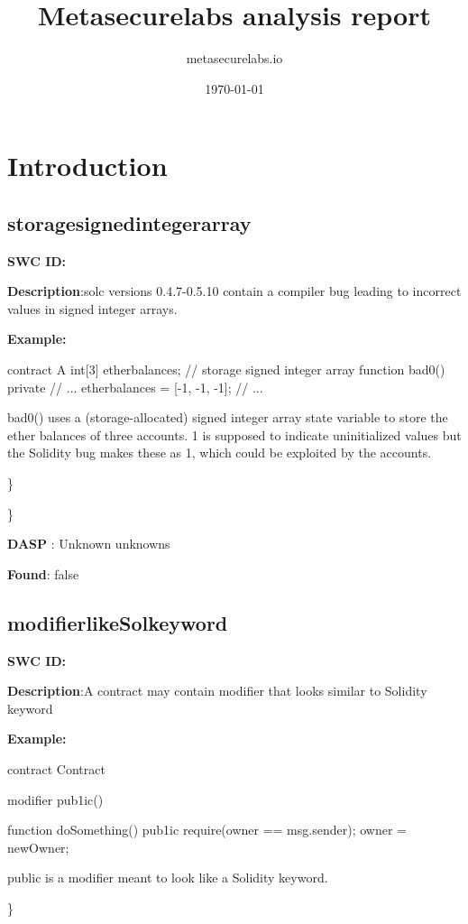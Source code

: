 \documentclass{article}
\title{Metasecurelabs analysis report}
\author{metasecurelabs.io }
\date{\today}
\begin{document}
 

\maketitle 

\section{Introduction} 
\subsection{storage\textunderscore signed\textunderscore integer\textunderscore array} 
\textbf{SWC \textunderscore ID:} 

\textbf{Description}:solc versions 0.4.7-0.5.10 contain a compiler bug leading to incorrect values in signed integer arrays.


\textbf{Example:} 

contract A {
  int[3] ether\textunderscore balances; // storage signed integer array
  function bad0() private {
    // ...
    ether\textunderscore balances = [-1, -1, -1];
    // ...
  }
}

bad0() uses a (storage-allocated) signed integer array state variable to store the ether balances of three accounts. 1 is supposed to indicate uninitialized values but the Solidity bug makes these as 1, which could be exploited by the accounts.

\} 

\} 

\textbf{DASP} : Unknown unknowns

\textbf{Found}: false

\subsection{modifier\textunderscore like\textunderscore Sol\textunderscore keyword} 
\textbf{SWC \textunderscore ID:} 

\textbf{Description}:A contract may contain modifier that looks similar to Solidity keyword


\textbf{Example:} 

contract Contract{
    modifier pub1ic() {
    }

    function doSomething() pub1ic {
        require(owner == msg.sender);
        owner = newOwner;
    }
}

public is a modifier meant to look like a Solidity keyword.

\} 
\end{document}
